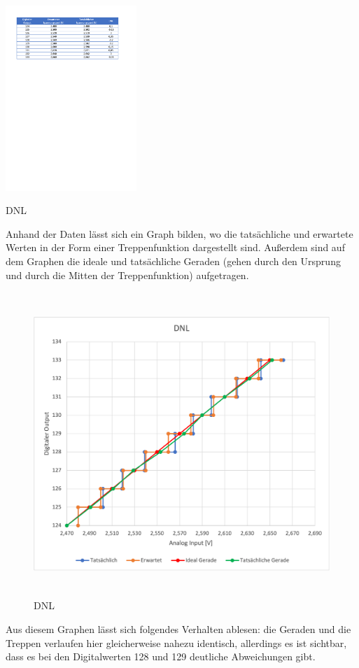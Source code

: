 \begin{table}[H]
	\centering
	\includegraphics[height=7cm]{images/DNL_Tabelle.pdf} 
	\caption{DNL}
	\label{table: DNL}
\end{table}

Anhand der Daten lässt sich ein Graph bilden, wo die tatsächliche und erwartete
Werten in der Form einer Treppenfunktion dargestellt sind. Außerdem sind auf dem
Graphen die ideale und tatsächliche Geraden (gehen durch den Ursprung und durch die
Mitten der Treppenfunktion) aufgetragen.

\begin{figure}[H]
	\centering
	\includegraphics[height=11.5cm]{images/DNL.png} 
	\caption{DNL}
	\label{fig: DNL}
\end{figure}

Aus diesem Graphen lässt sich folgendes Verhalten ablesen: die Geraden und die
Treppen verlaufen hier gleicherweise nahezu identisch, allerdings es ist sichtbar,
dass es bei den Digitalwerten 128 und 129 deutliche Abweichungen gibt.

